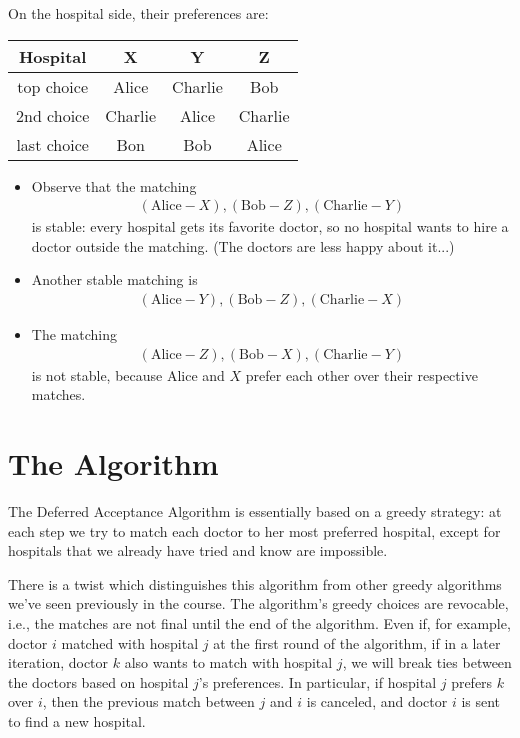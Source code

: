 \documentclass [12pt]{article}
\theoremstyle{definition}
\begin{document}
On the hospital side, their preferences are:
\begin{table}[!h]
\centering
\begin{tabular}{|c|c|c|c|}
\hline Hospital & X & Y & Z \\
\hline top choice & Alice & Charlie & Bob \\
2nd choice & Charlie & Alice & Charlie \\
last choice & Bon & Bob & Alice \\
\hline
\end{tabular}
\end{table}

\begin{itemize}
\item Observe that the matching
\begin{align}
(\text{Alice}-X), (\text{Bob}-Z), (\text{Charlie}-Y) \label{eq:1}
\end{align}
is stable: every hospital gets its favorite doctor, so no hospital wants to hire a doctor
outside the matching. (The doctors are less happy about it...)
\item Another stable matching is
\begin{align}
(\text{Alice} -Y), (\text{Bob}-Z), (\text{Charlie}-X) \label{eq:2}
\end{align}
\item The matching
\begin{align}
(\text{Alice} -Z), (\text{Bob}-X), (\text{Charlie}-Y) \label{eq:3}
\end{align}
is not stable, because Alice and $X$ prefer each other over their respective matches.
\end{itemize}

\section{The Algorithm} 

The Deferred Acceptance Algorithm is essentially based on a greedy strategy: at each step we try to match each doctor to her most preferred hospital, except for hospitals that we already have tried and know are impossible. 

There is a twist which distinguishes this algorithm from other greedy algorithms we've seen previously in the course. The algorithm's greedy choices are revocable, i.e., the matches are not final until the end of the algorithm. Even if, for example, doctor $i$ matched with hospital $j$ at the first round of the algorithm, if in a later iteration, doctor $k$ also wants to match with hospital $j$, we will break ties between the doctors based on hospital $j$'s preferences. In particular, if hospital $j$ prefers $k$ over $i$, then the previous match between $j$ and $i$ is canceled, and doctor $i$ is sent to find a new hospital.
\end{document}
